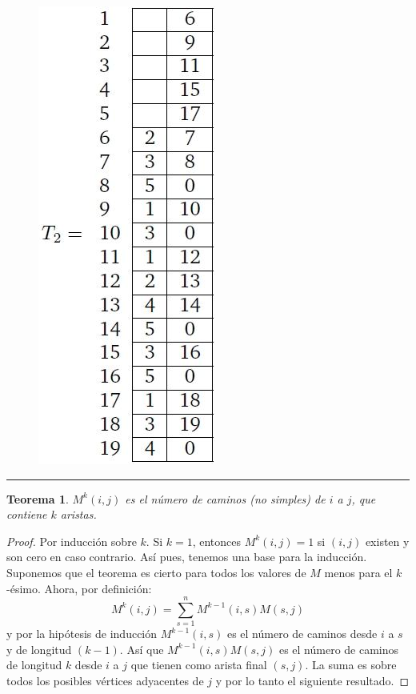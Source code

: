 \documentclass[10pt,a5paper]{book}
\newtheorem{teorema}{Teorema}[chapter]
\begin{document}
\begin{figure}[H]
{}
\hspace*{2in}
\hfill
\parbox{2cm}
{
  \begin{flushright}
    \hspace*{-.2in}\includegraphics[scale=0.51]{tablita_2.png}
  \end{flushright}
}
\end{figure}
\hrule
\begin{teorema}
$M^k(i,j)$ es el número de caminos (no simples) de $i$ a $j$, que contiene $k$ aristas.
\end{teorema}
\begin{proof}
Por inducción sobre $k$. Si $k = 1$, entonces $M^k(i,j) = 1$ si $(i,j)$ existen y son cero en caso contrario. Así pues, tenemos una base para la inducción. Suponemos que el teorema es cierto para todos los valores de $M$ menos para el $k$-ésimo. Ahora, por definición:
\[M^{k}(i,j) = \sum_{s=1}^{n} M^{k-1}(i,s) M(s,j) \]
y por la hipótesis de inducción $M^{k-1}(i,s)$ es el número de caminos desde $i$ a $s$ y de longitud $(k-1)$. Así que $M^{k-1}(i,s) M(s,j)$ es el número de caminos de longitud $k$ desde $i$ a $j$ que tienen como arista final $(s,j)$. La suma es sobre todos los posibles vértices adyacentes de $j$ y por lo tanto el siguiente resultado.\end{proof}
\end{document}
